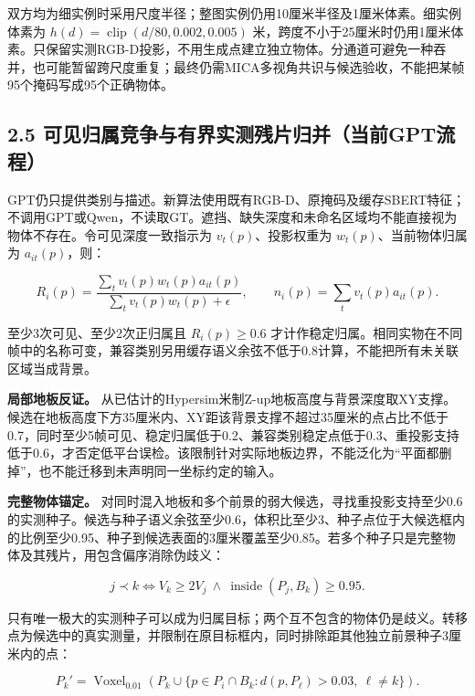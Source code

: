 \documentclass[UTF8,fontset=fandol]{ctexart}
\begin{document}
双方均为细实例时采用尺度半径；整图实例仍用10厘米半径及1厘米体素。细实例体素为 $h(d)=\operatorname{clip}(d/80,0.002,0.005)$ 米，跨度不小于25厘米时仍用1厘米体素。只保留实测RGB-D投影，不用生成点建立独立物体。分通道可避免一种吞并，也可能暂留跨尺度重复；最终仍需MICA多视角共识与候选验收，不能把某帧95个掩码写成95个正确物体。



\subsection*{2.5 可见归属竞争与有界实测残片归并（当前GPT流程）}

GPT仍只提供类别与描述。新算法使用既有RGB-D、原掩码及缓存SBERT特征；不调用GPT或Qwen，不读取GT。遮挡、缺失深度和未命名区域均不能直接视为物体不存在。令可见深度一致指示为 $v_t(p)$、投影权重为 $w_t(p)$、当前物体归属为 $a_{it}(p)$，则：



\[
R_i(p)=\frac{\sum_t v_t(p)w_t(p)a_{it}(p)}{\sum_t v_t(p)w_t(p)+\epsilon},\qquad
n_i(p)=\sum_t v_t(p)a_{it}(p).
\]

至少3次可见、至少2次正归属且 $R_i(p)\ge0.6$ 才计作稳定归属。相同实物在不同帧中的名称可变，兼容类别另用缓存语义余弦不低于0.8计算，不能把所有未关联区域当成背景。



\textbf{局部地板反证。} 从已估计的Hypersim米制Z-up地板高度与背景深度取XY支撑。候选在地板高度下方35厘米内、XY距该背景支撑不超过35厘米的点占比不低于0.7，同时至少5帧可见、稳定归属低于0.2、兼容类别稳定点低于0.3、重投影支持低于0.6，才否定低平台误检。该限制针对实际地板边界，不能泛化为“平面都删掉”，也不能迁移到未声明同一坐标约定的输入。



\textbf{完整物体锚定。} 对同时混入地板和多个前景的弱大候选，寻找重投影支持至少0.6的实测种子。候选与种子语义余弦至少0.6，体积比至少3、种子点位于大候选框内的比例至少0.95、种子到候选表面的3厘米覆盖至少0.85。若多个种子只是完整物体及其残片，用包含偏序消除伪歧义：



\[
j\prec k\iff V_k\ge2V_j\ \land\ \operatorname{inside}(P_j,B_k)\ge0.95.
\]

只有唯一极大的实测种子可以成为归属目标；两个互不包含的物体仍是歧义。转移点为候选中的真实测量，并限制在原目标框内，同时排除距其他独立前景种子3厘米内的点：



\[
P_k'=\operatorname{Voxel}_{0.01}\left(P_k\cup\{p\in P_i\cap B_k:d(p,P_\ell)>0.03,\ \ell\ne k\}\right).
\]
\end{document}
